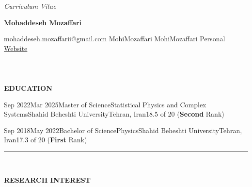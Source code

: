 \documentclass[11pt, b4paper]{cv}
\begin{document}
\begin{center}
	\textit{Curriculum Vitae}\\
	{\Large \textbf{Mohaddeseh Mozaffari}\par}
	\href{mailto:mohaddeseh.mozaffarii@gmail.com}{ mohaddeseh.mozaffarii@gmail.com}
	\hspace{5pt} 
	\href{https://www.linkedin.com/in/MohiMozaffari/}{ MohiMozaffari}
	\hspace{5pt} 
	\href{https://github.com/MohiMozaffari}{ MohiMozaffari}
	\hspace{5pt} 
	\href{https://mohimozaffari.github.io/}{ Personal Website} 
\end{center}


\vspace{-0.15in}
\rule{\textwidth}{1pt}\\
\vspace{-0.15in}

\textbf{EDUCATION}

\begin{education}{Sep 2022}{Mar 2025}{Master of Science}{Statistical Physics and Complex Systems}{Shahid Beheshti University}{Tehran, Iran}{18.5 of 20 (\textbf{Second} Rank)}
\end{education}
\begin{education}{Sep 2018}{May 2022}{Bachelor of Science}{Physics}{Shahid Beheshti University}{Tehran, Iran}{17.3 of 20 (\textbf{First} Rank)}
\end{education}

\vspace{-0.15in}
\rule{\textwidth}{1pt}\\
\vspace{-0.15in}

\textbf{RESEARCH INTEREST}
\vspace{-0.1in}



\end{document}
